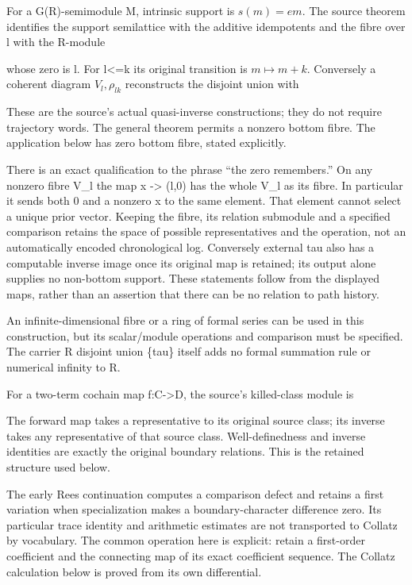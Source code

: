 For a G(R)-semimodule M, intrinsic support is \(s(m)=em\). The source
theorem identifies the support semilattice with the additive idempotents
and the fibre over l with the R-module


whose zero is l. For l\textless=k its original transition is
\(m\mapsto m+k\). Conversely a coherent diagram \(V_l,\rho_{lk}\)
reconstructs the disjoint union with


These are the source's actual quasi-inverse constructions; they do not
require trajectory words. The general theorem permits a nonzero bottom
fibre. The application below has zero bottom fibre, stated explicitly.

There is an exact qualification to the phrase ``the zero remembers.'' On
any nonzero fibre V\_l the map x -\textgreater{} (l,0) has the whole
V\_l as its fibre. In particular it sends both 0 and a nonzero x to the
same element. That element cannot select a unique prior vector. Keeping
the fibre, its relation submodule and a specified comparison retains the
space of possible representatives and the operation, not an
automatically encoded chronological log. Conversely external tau also
has a computable inverse image once its original map is retained; its
output alone supplies no non-bottom support. These statements follow
from the displayed maps, rather than an assertion that there can be no
relation to path history.

An infinite-dimensional fibre or a ring of formal series can be used in
this construction, but its scalar/module operations and comparison must
be specified. The carrier R disjoint union \{tau\} itself adds no formal
summation rule or numerical infinity to R.

For a two-term cochain map f:C-\textgreater D, the source's killed-class
module is


The forward map takes a representative to its original source class; its
inverse takes any representative of that source class. Well-definedness
and inverse identities are exactly the original boundary relations. This
is the retained structure used below.

The early Rees continuation computes a comparison defect and retains a
first variation when specialization makes a boundary-character
difference zero. Its particular trace identity and arithmetic estimates
are not transported to Collatz by vocabulary. The common operation here
is explicit: retain a first-order coefficient and the connecting map of
its exact coefficient sequence. The Collatz calculation below is proved
from its own differential.

